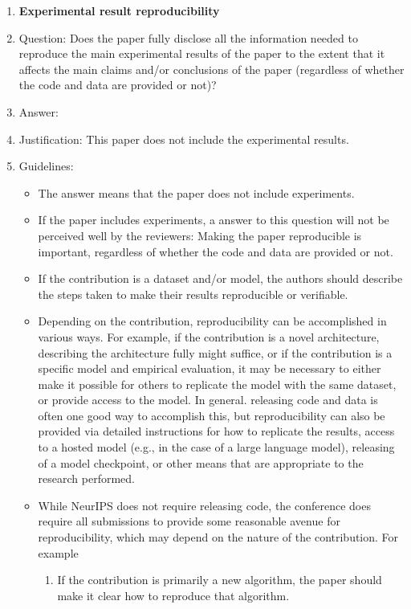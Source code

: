 \documentclass{article}
\theoremstyle{definition}
\theoremstyle{remark}
\begin{document}
\begin{enumerate}
    \item {\bf Experimental result reproducibility}
    \item[] Question: Does the paper fully disclose all the information needed to reproduce the main experimental results of the paper to the extent that it affects the main claims and/or conclusions of the paper (regardless of whether the code and data are provided or not)?
    \item[] Answer: \answerNA{} %
    \item[] Justification: This paper does not include the  experimental results.
    \item[] Guidelines:
    \begin{itemize}
        \item The answer \answerNA{} means that the paper does not include experiments.
        \item If the paper includes experiments, a \answerNo{} answer to this question will not be perceived well by the reviewers: Making the paper reproducible is important, regardless of whether the code and data are provided or not.
        \item If the contribution is a dataset and\slash or model, the authors should describe the steps taken to make their results reproducible or verifiable. 
        \item Depending on the contribution, reproducibility can be accomplished in various ways. For example, if the contribution is a novel architecture, describing the architecture fully might suffice, or if the contribution is a specific model and empirical evaluation, it may be necessary to either make it possible for others to replicate the model with the same dataset, or provide access to the model. In general. releasing code and data is often one good way to accomplish this, but reproducibility can also be provided via detailed instructions for how to replicate the results, access to a hosted model (e.g., in the case of a large language model), releasing of a model checkpoint, or other means that are appropriate to the research performed.
        \item While NeurIPS does not require releasing code, the conference does require all submissions to provide some reasonable avenue for reproducibility, which may depend on the nature of the contribution. For example
        \begin{enumerate}
            \item If the contribution is primarily a new algorithm, the paper should make it clear how to reproduce that algorithm.

\end{enumerate}
\end{itemize}
\end{enumerate}
\end{document}
